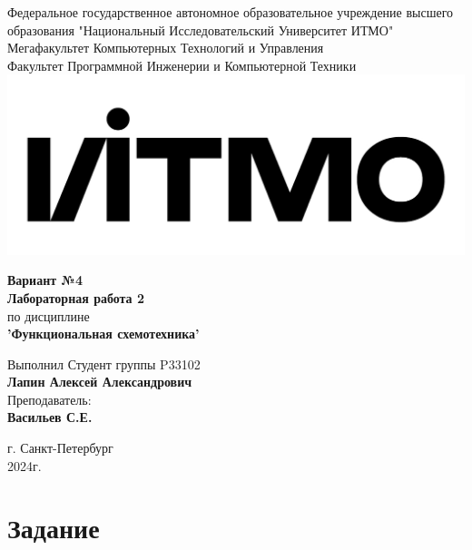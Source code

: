 \documentclass[12pt,onecolumn]{article}
\begin{document}
\setcounter{tocdepth}{4}
\begin{center}
    Федеральное государственное автономное образовательное учреждение высшего образования "Национальный Исследовательский Университет ИТМО"\\ 
    Мегафакультет Компьютерных Технологий и Управления\\
    Факультет Программной Инженерии и Компьютерной Техники \\
    \includegraphics[scale=0.3]{image/itmo.jpg} %
\end{center}
\vspace{1cm}


\begin{center}
    \large \textbf{Вариант №4}\\
    \textbf{Лабораторная работа 2}\\
    по дисциплине\\
    \textbf{'Функциональная схемотехника'}
\end{center}

\vspace{2cm}

\begin{flushright}
  Выполнил Студент  группы P33102\\
  \textbf{Лапин Алексей Александрович}\\
  Преподаватель: \\
  \textbf{Васильев С.Е.}\\
\end{flushright}

\vspace{9cm}
\begin{center}
    г. Санкт-Петербург\\
    2024г.
\end{center}
\pagestyle{empty}

\newpage
\tableofcontents
\newpage
\section{Задание}
\end{document}
